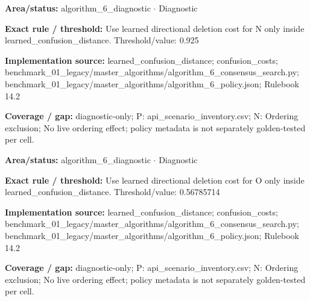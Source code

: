 \begin{tcolorbox}[enhanced,breakable,colback=white,colframe=Muted!45,boxrule=0.45pt,arc=1.5pt,left=6pt,right=6pt,top=5pt,bottom=5pt,title={\texttt{A6-LEARNED-DELETION-N}},title after break={\texttt{A6-LEARNED-DELETION-N}\ (continued)},fonttitle=\headingfont\bfseries\color{Navy},coltitle=Navy]
\textbf{Area/status:} algorithm\_\allowbreak{}6\_\allowbreak{}diagnostic $\boldsymbol{\cdot}$ Diagnostic\par
\smallskip
\textbf{Exact rule / threshold:} Use learned directional deletion cost for N only inside learned\_\allowbreak{}confusion\_\allowbreak{}distance. Threshold/\allowbreak{}value: 0.925\par
\smallskip
\textbf{Implementation source:} learned\_\allowbreak{}confusion\_\allowbreak{}distance; confusion\_\allowbreak{}costs; benchmark\_\allowbreak{}01\_\allowbreak{}legacy/\allowbreak{}master\_\allowbreak{}algorithms/\allowbreak{}algorithm\_\allowbreak{}6\_\allowbreak{}consensus\_\allowbreak{}search.py; benchmark\_\allowbreak{}01\_\allowbreak{}legacy/\allowbreak{}master\_\allowbreak{}algorithms/\allowbreak{}algorithm\_\allowbreak{}6\_\allowbreak{}policy.json; Rulebook 14.2\par
\smallskip
\textbf{Coverage / gap:} diagnostic-only; P: api\_\allowbreak{}scenario\_\allowbreak{}inventory.csv; N: Ordering exclusion; No live ordering effect; policy metadata is not separately golden-tested per cell.
\end{tcolorbox}
\begin{tcolorbox}[enhanced,breakable,colback=white,colframe=Muted!45,boxrule=0.45pt,arc=1.5pt,left=6pt,right=6pt,top=5pt,bottom=5pt,title={\texttt{A6-LEARNED-DELETION-O}},title after break={\texttt{A6-LEARNED-DELETION-O}\ (continued)},fonttitle=\headingfont\bfseries\color{Navy},coltitle=Navy]
\textbf{Area/status:} algorithm\_\allowbreak{}6\_\allowbreak{}diagnostic $\boldsymbol{\cdot}$ Diagnostic\par
\smallskip
\textbf{Exact rule / threshold:} Use learned directional deletion cost for O only inside learned\_\allowbreak{}confusion\_\allowbreak{}distance. Threshold/\allowbreak{}value: 0.56785714\par
\smallskip
\textbf{Implementation source:} learned\_\allowbreak{}confusion\_\allowbreak{}distance; confusion\_\allowbreak{}costs; benchmark\_\allowbreak{}01\_\allowbreak{}legacy/\allowbreak{}master\_\allowbreak{}algorithms/\allowbreak{}algorithm\_\allowbreak{}6\_\allowbreak{}consensus\_\allowbreak{}search.py; benchmark\_\allowbreak{}01\_\allowbreak{}legacy/\allowbreak{}master\_\allowbreak{}algorithms/\allowbreak{}algorithm\_\allowbreak{}6\_\allowbreak{}policy.json; Rulebook 14.2\par
\smallskip
\textbf{Coverage / gap:} diagnostic-only; P: api\_\allowbreak{}scenario\_\allowbreak{}inventory.csv; N: Ordering exclusion; No live ordering effect; policy metadata is not separately golden-tested per cell.
\end{tcolorbox}
